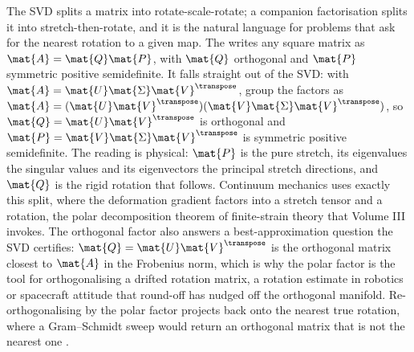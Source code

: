 \begin{mastery}
The SVD splits a matrix into rotate-scale-rotate; a companion
factorisation splits it into stretch-then-rotate, and it is the natural
language for problems that ask for the nearest rotation to a given map.
The  writes any square matrix as $\mat{A}
= \mat{Q}\mat{P}$, with $\mat{Q}$ orthogonal and $\mat{P}$ symmetric
positive semidefinite. It falls straight out of the SVD: with $\mat{A}
= \mat{U}\mat{\Sigma}\mat{V}^{\transpose}$, group the factors as
$\mat{A} = (\mat{U}\mat{V}^{\transpose})(\mat{V}\mat{\Sigma}
\mat{V}^{\transpose})$, so $\mat{Q} = \mat{U}\mat{V}^{\transpose}$ is
orthogonal and $\mat{P} = \mat{V}\mat{\Sigma}\mat{V}^{\transpose}$ is
symmetric positive semidefinite. The reading is physical: $\mat{P}$ is
the pure stretch, its eigenvalues the singular values and its
eigenvectors the principal stretch directions, and $\mat{Q}$ is the
rigid rotation that follows. Continuum mechanics uses exactly this
split, where the deformation gradient factors into a stretch tensor and
a rotation, the polar decomposition theorem of finite-strain theory
that Volume III invokes. The orthogonal factor also answers a
best-approximation question the SVD certifies: $\mat{Q} = \mat{U}
\mat{V}^{\transpose}$ is the orthogonal matrix closest to $\mat{A}$ in
the Frobenius norm, which is why the polar factor is the tool for
orthogonalising a drifted rotation matrix, a rotation estimate in
robotics or spacecraft attitude that round-off has nudged off the
orthogonal manifold. Re-orthogonalising by the polar factor projects
back onto the nearest true rotation, where a Gram--Schmidt sweep would
return an orthogonal matrix that is not the nearest one
\cite[ch.~9]{text:v2ch09-golub-vanloan2013}.
\end{mastery}

